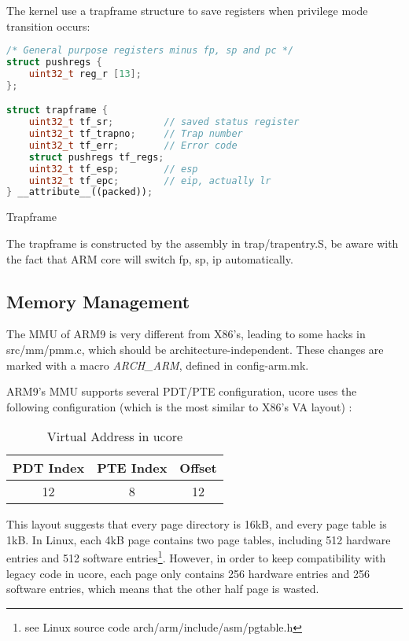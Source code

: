 \documentclass[a4paper]{article}
\begin{document}
The kernel use a trapframe structure to save registers when privilege mode transition occurs:
\begin{algorithm}[h]
   \begin{lstlisting}[language={C++}]
/* General purpose registers minus fp, sp and pc */
struct pushregs {
    uint32_t reg_r [13];
};

struct trapframe {
	uint32_t tf_sr;			// saved status register
	uint32_t tf_trapno;		// Trap number
	uint32_t tf_err;		// Error code
	struct pushregs tf_regs;
	uint32_t tf_esp;		// esp
	uint32_t tf_epc;		// eip, actually lr
} __attribute__((packed));

\end{lstlisting}
\caption{Trapframe}
\end{algorithm}

The trapframe is constructed by the assembly in trap/trapentry.S, be aware with the fact that
ARM core will switch fp, sp, ip automatically.

\subsection{Memory Management}
\label{sec:mm}
The MMU of ARM9 is very different from X86's, leading to some hacks in src/mm/pmm.c,
which should be architecture-independent. These changes are marked with a macro
\emph{ARCH\_ARM}, defined in config-arm.mk.

ARM9's MMU supports several PDT/PTE configuration, ucore uses the following 
configuration (which is the most similar to X86's VA layout) :

\begin{table}[H]
\centering
\begin{tabular}{|c|c|c|}
\hline
PDT Index & PTE Index & Offset \\
\hline
12 & 8 & 12 \\
\hline
\end{tabular}
\caption{Virtual Address in ucore}
\label{tab:va_layout}
\end{table}

This layout suggests that every page directory is 16kB, and every page
table is 1kB. In Linux, each 4kB page contains two page tables, including
512 hardware entries and 512 software entries\footnote{see Linux source code
 arch/arm/include/asm/pgtable.h}. However, in order to keep compatibility
 with legacy code in ucore, each page only contains 256 hardware entries
 and 256 software entries, which means that the other half page is wasted. 
\end{document}
